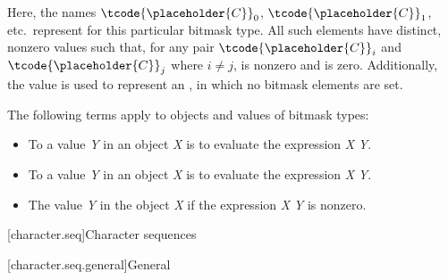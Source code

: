 \pnum
Here, the names $\tcode{\placeholder{C}}_0$,
$\tcode{\placeholder{C}}_1$, etc.\ represent
for this particular bitmask type.
%
All such elements have distinct, nonzero values such that, for any pair $\tcode{\placeholder{C}}_i$
and $\tcode{\placeholder{C}}_j$ where $i \neq j$,  is nonzero and
 is zero.
Additionally, the value  is used to represent an , in which no
bitmask elements are set.

\pnum
The following terms apply to objects and values of
bitmask types:
\begin{itemize}
\item
To 
a value \textit{Y} in an object \textit{X}
is to evaluate the expression \textit{X} \tcode{|=} \textit{Y}.
\item
To 
a value \textit{Y} in an object
\textit{X} is to evaluate the expression \textit{X} \tcode{\&= \~}\textit{Y}.
\item
The value \textit{Y}  in the object
\textit{X} if the expression \textit{X} \tcode{\&} \textit{Y} is nonzero.
\end{itemize}

[character.seq]{Character sequences}

[character.seq.general]{General}


